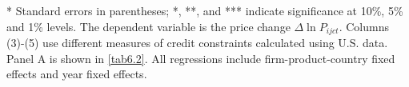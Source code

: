 \begin{table}[htbp]
\begin{threeparttable}
\begin{tabular}{lccccc}
		\bottomrule
	    \end{tabular}
    \begin{tablenotes}
    	\footnotesize
    	\item[*] Standard errors in parentheses; *, **, and *** indicate significance at 10\%, 5\% and 1\% levels. The dependent variable is the price change $\Delta \ln P_{ijct}$. Columns (3)-(5) use different measures of credit constraints calculated using U.S. data. Panel A is shown in \ref{tab6.2}. All regressions include firm-product-country fixed effects and year fixed effects.
    \end{tablenotes}
	\end{threeparttable}
	\label{tabA.3}
\end{table}